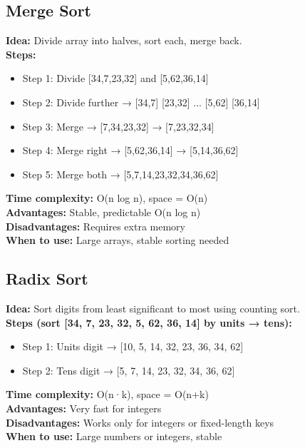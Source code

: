 \documentclass[a4paper,12pt]{article}
\begin{document}
\subsection{Merge Sort}
\textbf{Idea:} Divide array into halves, sort each, merge back.\\ 
\textbf{Steps:}  
\begin{itemize}
\item Step 1: Divide [34,7,23,32] and [5,62,36,14]

\item Step 2: Divide further → [34,7] [23,32] ... [5,62] [36,14]

\item Step 3: Merge → [7,34,23,32] → [7,23,32,34]

\item Step 4: Merge right → [5,62,36,14] → [5,14,36,62]

\item Step 5: Merge both → [5,7,14,23,32,34,36,62]
\end{itemize}
\textbf{Time complexity:} O(n log n), space = O(n)\\
\textbf{Advantages:} Stable, predictable O(n log n)\\
\textbf{Disadvantages:} Requires extra memory\\
\textbf{When to use:} Large arrays, stable sorting needed
\subsection{Radix Sort}
\textbf{Idea:} Sort digits from least significant to most using counting sort.  \\
\textbf{Steps (sort [34, 7, 23, 32, 5, 62, 36, 14] by units → tens):}
\begin{itemize}
\item Step 1: Units digit → [10, 5, 14, 32, 23, 36, 34, 62]

\item Step 2: Tens digit → [5, 7, 14, 23, 32, 34, 36, 62]
\end{itemize}
\textbf{Time complexity:} O(n·k), space = O(n+k)\\
\textbf{Advantages:} Very fast for integers\\
\textbf{Disadvantages:} Works only for integers or fixed-length keys\\
\textbf{When to use:} Large numbers or integers, stable
\end{document}
